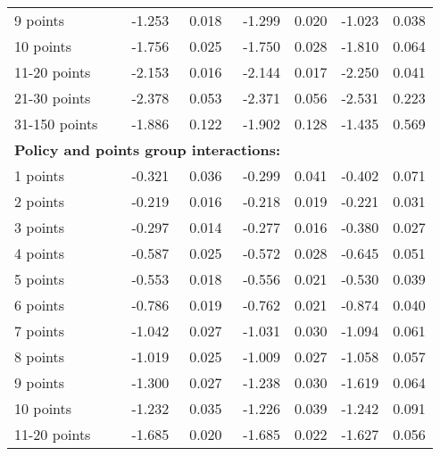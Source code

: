 \begin{table}
\begin{tabular}{l r r r r r r}
9 points  & -1.253  &  0.018  & -1.299  &  0.020  & -1.023  &  0.038   \\ 
 
10 points  & -1.756  &  0.025  & -1.750  &  0.028  & -1.810  &  0.064   \\ 
 
11-20 points  & -2.153  &  0.016  & -2.144  &  0.017  & -2.250  &  0.041   \\ 
 
21-30 points  & -2.378  &  0.053  & -2.371  &  0.056  & -2.531  &  0.223   \\ 
 
31-150 points  & -1.886  &  0.122  & -1.902  &  0.128  & -1.435  &  0.569   \\ 
 

\hline 
 
\multicolumn{4}{l}{\textbf{Policy and points group interactions:}}  \\ 
 
1 points  & -0.321  &  0.036  & -0.299  &  0.041  & -0.402  &  0.071   \\ 
 
2 points  & -0.219  &  0.016  & -0.218  &  0.019  & -0.221  &  0.031   \\ 
 
3 points  & -0.297  &  0.014  & -0.277  &  0.016  & -0.380  &  0.027   \\ 
 
4 points  & -0.587  &  0.025  & -0.572  &  0.028  & -0.645  &  0.051   \\ 
 
5 points  & -0.553  &  0.018  & -0.556  &  0.021  & -0.530  &  0.039   \\ 
 
6 points  & -0.786  &  0.019  & -0.762  &  0.021  & -0.874  &  0.040   \\ 
 
7 points  & -1.042  &  0.027  & -1.031  &  0.030  & -1.094  &  0.061   \\ 
 
8 points  & -1.019  &  0.025  & -1.009  &  0.027  & -1.058  &  0.057   \\ 
 
9 points  & -1.300  &  0.027  & -1.238  &  0.030  & -1.619  &  0.064   \\ 
 
10 points  & -1.232  &  0.035  & -1.226  &  0.039  & -1.242  &  0.091   \\ 
 
11-20 points  & -1.685  &  0.020  & -1.685  &  0.022  & -1.627  &  0.056   \\ 
 

\end{tabular}
\end{table}
